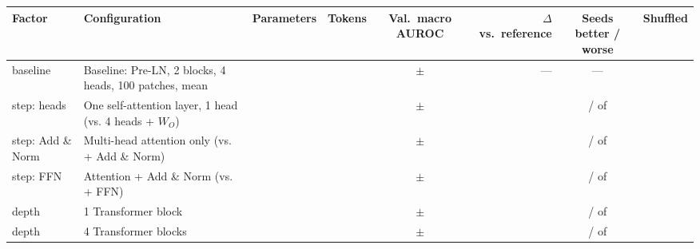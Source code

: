 \begin{tabular}{llrrcrcr}
\toprule
Factor & Configuration & Parameters & Tokens & Val.\ macro AUROC & $\Delta$ vs.\ reference & Seeds better / worse & Shuffled \\
\midrule
baseline & Baseline: Pre-LN, 2 blocks, 4 heads, 100 patches, mean & \transformerParamsBase{} & \transformerTokensBase{} & \transformerValAurocMeanBase{} $\pm$ \transformerValAurocSdBase{} & --- & --- & \transformerOrderDropBase{} \\
\addlinespace
step: heads & One self-attention layer, 1 head (vs. 4 heads + $W_O$) & \transformerParamsSaSingle{} & \transformerTokensSaSingle{} & \transformerValAurocMeanSaSingle{} $\pm$ \transformerValAurocSdSaSingle{} & \transformerDiffMeanSaSingle{} & \transformerNSeedsBetterSaSingle{} / \transformerNSeedsWorseSaSingle{} of \transformerNSeedsComparedSaSingle{} & \transformerOrderDropSaSingle{} \\
\addlinespace
step: Add \& Norm & Multi-head attention only (vs. + Add \& Norm) & \transformerParamsMhsa{} & \transformerTokensMhsa{} & \transformerValAurocMeanMhsa{} $\pm$ \transformerValAurocSdMhsa{} & \transformerDiffMeanMhsa{} & \transformerNSeedsBetterMhsa{} / \transformerNSeedsWorseMhsa{} of \transformerNSeedsComparedMhsa{} & \transformerOrderDropMhsa{} \\
\addlinespace
step: FFN & Attention + Add \& Norm (vs. + FFN) & \transformerParamsNoFfn{} & \transformerTokensNoFfn{} & \transformerValAurocMeanNoFfn{} $\pm$ \transformerValAurocSdNoFfn{} & \transformerDiffMeanNoFfn{} & \transformerNSeedsBetterNoFfn{} / \transformerNSeedsWorseNoFfn{} of \transformerNSeedsComparedNoFfn{} & \transformerOrderDropNoFfn{} \\
\addlinespace
depth & 1 Transformer block & \transformerParamsLayersOne{} & \transformerTokensLayersOne{} & \transformerValAurocMeanLayersOne{} $\pm$ \transformerValAurocSdLayersOne{} & \transformerDiffMeanLayersOne{} & \transformerNSeedsBetterLayersOne{} / \transformerNSeedsWorseLayersOne{} of \transformerNSeedsComparedLayersOne{} & \transformerOrderDropLayersOne{} \\
depth & 4 Transformer blocks & \transformerParamsLayersFour{} & \transformerTokensLayersFour{} & \transformerValAurocMeanLayersFour{} $\pm$ \transformerValAurocSdLayersFour{} & \transformerDiffMeanLayersFour{} & \transformerNSeedsBetterLayersFour{} / \transformerNSeedsWorseLayersFour{} of \transformerNSeedsComparedLayersFour{} & \transformerOrderDropLayersFour{} \\

\end{tabular}
